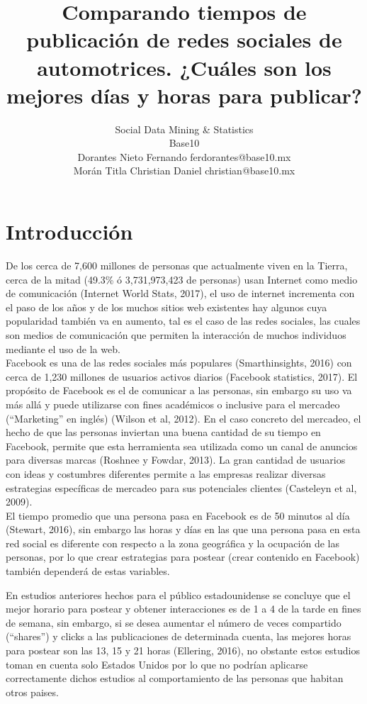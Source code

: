\documentclass[a4paper,10pt]{article}
\title{Comparando tiempos de publicación de redes sociales de automotrices. ¿Cuáles son los mejores días y horas para publicar?}
\author{Social Data Mining \& Statistics \\
        Base10\\
        \scriptsize Dorantes Nieto Fernando ferdorantes@base10.mx \\
        \scriptsize Morán Titla Christian Daniel christian@base10.mx}
\date{}
\begin{document}
\maketitle


\section{Introducción}
De los cerca de 7,600 millones de personas que  actualmente viven en la Tierra, cerca
de la mitad (49.3\% ó 3,731,973,423 de personas) usan Internet como medio de comunicación (Internet World Stats, 2017),
el uso de internet incrementa con el paso de los años y de los muchos sitios web existentes
hay algunos cuya popularidad también va en aumento, tal es el caso de las redes sociales,
las cuales son  medios de comunicación que permiten la interacción 
de muchos individuos mediante el uso de la web.\\

Facebook es una de las redes sociales más populares (Smarthinsights, 2016) con cerca de
1,230 millones de usuarios activos diarios (Facebook statistics, 2017).
El propósito de Facebook es el de comunicar  a las personas, sin embargo
su uso va más allá y puede utilizarse con fines académicos o inclusive para el mercadeo (``Marketing'' en inglés) (Wilson et al, 2012).
En el caso concreto del mercadeo, el hecho de que las personas inviertan una buena cantidad de su tiempo en Facebook, 
permite que esta herramienta sea utilizada como un canal de anuncios para diversas marcas (Roshnee y Fowdar, 2013).
La gran cantidad de usuarios con ideas y costumbres diferentes permite a las empresas
realizar diversas estrategias específicas de mercadeo para sus potenciales clientes 
(Casteleyn et al, 2009).\\

El tiempo promedio que una persona pasa en Facebook es de 50 minutos al día (Stewart, 2016),
sin embargo las horas y días en las que una persona pasa en esta red social es diferente
con respecto a la zona geográfica y la ocupación de las personas, por lo que crear estrategias 
para postear (crear contenido en Facebook) también dependerá de estas variables.

En estudios anteriores hechos para el público estadounidense se concluye que el mejor
horario para postear y obtener interacciones es  de 1 a 4 de la tarde en fines de semana, sin embargo, 
si se desea aumentar el número de veces compartido (``shares'') y clicks a las publicaciones de determinada cuenta,
las mejores horas para postear son las 13, 15 y 21 horas (Ellering, 2016), no obstante estos estudios
toman en cuenta solo Estados Unidos por lo que no podrían aplicarse correctamente dichos estudios
al comportamiento de las personas que habitan otros paises.\\
\end{document}
